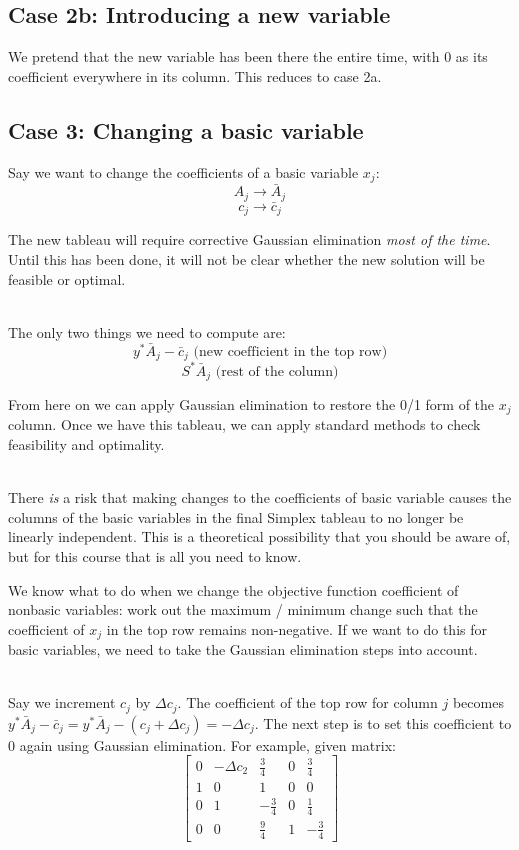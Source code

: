 \documentclass[12pt]{article}
\begin{document}
\subsection*{Case 2b: Introducing a new variable}
We pretend that the new variable has been there the entire time, with 0 as its coefficient everywhere in its column.
This reduces to case 2a.

\subsection*{Case 3: Changing a basic variable}
Say we want to change the coefficients of a basic variable $x_j$:
\[ A_j \rightarrow \bar{A}_j \]
\[ c_j \rightarrow \bar{c}_j \]

\noindent
The new tableau will require corrective Gaussian elimination \textit{most of the time}.
Until this has been done, it will not be clear whether the new solution will be feasible or optimal.

\noindent
\\
The only two things we need to compute are:
\[ y^* \bar{A}_j - \bar{c}_j \text{ (new coefficient in the top row)} \]
\[ S^* \bar{A}_j \text{ (rest of the column)} \]

\noindent
From here on we can apply Gaussian elimination to restore the 0/1 form of the $x_j$ column.
Once we have this tableau, we can apply standard methods to check feasibility and optimality.

\noindent
\\
There \textit{is} a risk that making changes to the coefficients of basic variable causes the columns of the basic variables in the final Simplex tableau to no longer be linearly independent.
This is a theoretical possibility that you should be aware of, but for this course that is all you need to know.

\newpage
\noindent
We know what to do when we change the objective function coefficient of nonbasic variables: work out the maximum / minimum change such that the coefficient of $x_j$ in the top row remains non-negative.
If we want to do this for basic variables, we need to take the Gaussian elimination steps into account.

\noindent
\\
Say we increment $c_j$ by $\Delta c_j$.
The coefficient of the top row for column $j$ becomes $y^* \bar{A}_j - \bar{c}_j = y^* \bar{A}_j - (c_j + \Delta c_j) = -\Delta c_j$.
The next step is to set this coefficient to 0 again using Gaussian elimination.
For example, given matrix:
\[ \begin{bmatrix}
    0 & -\Delta c_2 & \frac{3}{4} & 0 & \frac{3}{4}\\
    1 & 0 & 1 & 0 & 0\\
    0 & 1 & -\frac{3}{4} & 0 & \frac{1}{4}\\
    0 & 0 & \frac{9}{4} & 1 & -\frac{3}{4}
\end{bmatrix} \]
\end{document}
